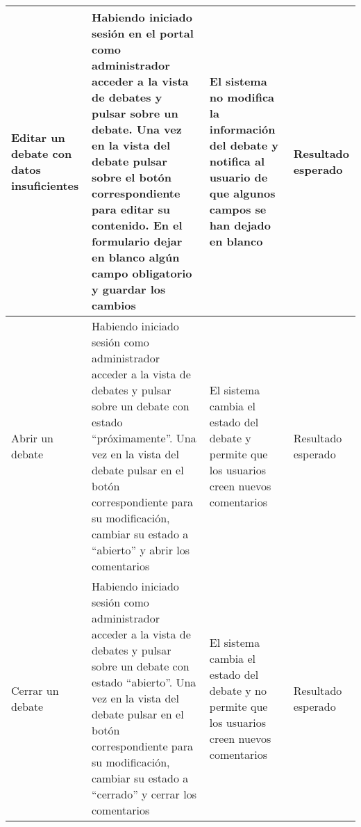 \begin{landscape}
\begin{longtable}[c]{|p{50mm}|p{50mm}|p{50mm}|p{50mm}|}
	 	\hline
	 	Editar un debate con datos insuficientes & Habiendo iniciado sesión en el portal como administrador acceder a la vista de debates y pulsar sobre un debate.  Una vez en la vista del debate pulsar sobre el botón correspondiente para editar su contenido.  En el formulario dejar en blanco algún campo obligatorio y guardar los cambios & El sistema no modifica la información del debate y notifica al usuario de que algunos campos se han dejado en blanco & Resultado esperado \\
	 	\hline
	 	Abrir un debate & Habiendo iniciado sesión como administrador acceder a la vista de debates y pulsar sobre un debate con estado ``próximamente''.  Una vez en la vista del debate pulsar en el botón correspondiente para su modificación, cambiar su estado a ``abierto'' y abrir los comentarios & El sistema cambia el estado del debate y permite que los usuarios creen nuevos comentarios & Resultado esperado\\
	 	\hline
	 	Cerrar un debate & Habiendo iniciado sesión como administrador acceder a la vista de debates y pulsar sobre un debate con estado ``abierto''.  Una vez en la vista del debate pulsar en el botón correspondiente para su modificación, cambiar su estado a ``cerrado'' y cerrar los comentarios & El sistema cambia el estado del debate y no permite que los usuarios creen nuevos comentarios & Resultado esperado\\
	 	\hline
	 	\hline
	 	
	 	 \end{longtable}
\end{landscape}


